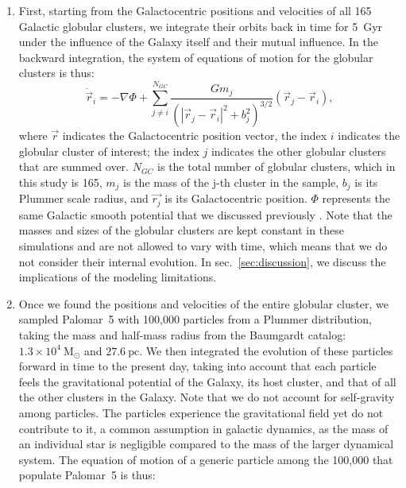             \begin{enumerate}
                \item First, starting from the Galactocentric positions and velocities of all 165 Galactic globular clusters, we integrate their orbits back in time for 5~Gyr under the influence of the Galaxy itself and their mutual influence. In the backward integration, the system of equations of motion for the globular clusters is thus: 
                \begin{equation}
                    \ddot{\vec{r}}_i = -\nabla \Phi + \left.\sum_{j\neq i}^{N_{GC}} \frac{Gm_j}{\left(|\vec{r}_j - \vec{r}_i|^2 + b_j^2\right)^{3/2}}\right. \left(\vec{r}_j - \vec{r}_i\right),
                \end{equation}\label{eq:GCNBody} 
                \noindent where $\vec{r}$ indicates the Galactocentric position vector, the index $i$ indicates the globular cluster of interest; the index $j$ indicates the other globular clusters that are summed over. $N_{GC}$ is the total number of globular clusters, which in this study is 165, $m_j$ is the mass of the j-th cluster in the sample, $b_j$ is its Plummer scale radius, and $\vec{r_j}$ is its Galactocentric position. $\Phi$ represents the same Galactic smooth potential that we discussed previously \citep[][Model~II, in the present case]{2017A&A...598A..66P}. Note that the masses and sizes of the globular clusters are kept constant in these simulations and are not allowed to vary with time, which means that we do not consider their internal evolution. In sec.~\ref{sec:discussion}, we discuss the implications of the modeling limitations.
                \item Once we found the positions and velocities of the entire globular cluster, we sampled Palomar~5 with 100,000 particles from a Plummer distribution, taking the mass and half-mass radius from the Baumgardt catalog: $1.3\times10^{4}~\mathrm{M}_\odot$ and $27.6~\mathrm{pc}$. We then integrated the evolution of these particles forward in time to the present day, taking into account that each particle feels the gravitational potential of the Galaxy, its host cluster, and that of all the other clusters in the Galaxy. Note that we do not account for self-gravity among particles. The particles experience the gravitational field yet do not contribute to it, a common assumption in galactic dynamics, as the mass of an individual star is negligible compared to the mass of the larger dynamical system. The equation of motion of a generic particle among the 100,000 that populate Palomar~5 is thus: 

\end{enumerate}
